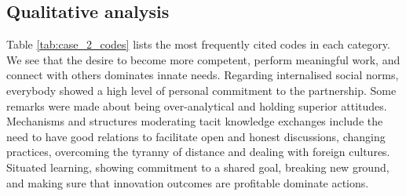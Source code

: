 \subsection{Qualitative analysis}

Table \ref{tab:case_2_codes} lists the most frequently cited codes in each category. We see that the desire to become more competent, perform meaningful work, and connect with others dominates innate needs. Regarding internalised social norms, everybody showed a high level of personal commitment to the partnership. Some remarks were made about being over-analytical and holding superior attitudes. Mechanisms and structures moderating tacit knowledge exchanges include the need to have good relations to facilitate open and honest discussions, changing practices,  overcoming the tyranny of distance and dealing with foreign cultures. Situated learning, showing commitment to a shared goal, breaking new ground, and making sure that innovation outcomes are profitable dominate actions.

